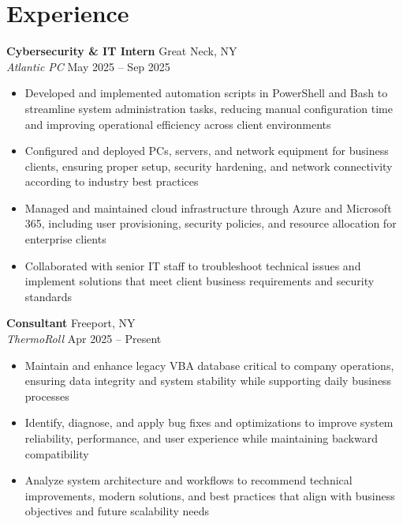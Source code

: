 \documentclass[a4paper,10pt]{article}
\newcommand{\company}[1]{\textit{\small #1}}
\begin{document}
\section*{Experience}
\noindent\textbf{Cybersecurity \& IT Intern} \hfill Great Neck, NY \\
\company{Atlantic PC} \hfill May 2025 -- Sep 2025
\begin{itemize}
\item Developed and implemented automation scripts in PowerShell and Bash to streamline system administration tasks, reducing manual configuration time and improving operational efficiency across client environments
\item Configured and deployed PCs, servers, and network equipment for business clients, ensuring proper setup, security hardening, and network connectivity according to industry best practices
\item Managed and maintained cloud infrastructure through Azure and Microsoft 365, including user provisioning, security policies, and resource allocation for enterprise clients
\item Collaborated with senior IT staff to troubleshoot technical issues and implement solutions that meet client business requirements and security standards
\end{itemize}
\noindent\textbf{Consultant} \hfill Freeport, NY \\
\company{ThermoRoll} \hfill Apr 2025 -- Present
\begin{itemize}
\item Maintain and enhance legacy VBA database critical to company operations, ensuring data integrity and system stability while supporting daily business processes
\item Identify, diagnose, and apply bug fixes and optimizations to improve system reliability, performance, and user experience while maintaining backward compatibility
\item Analyze system architecture and workflows to recommend technical improvements, modern solutions, and best practices that align with business objectives and future scalability needs
\end{itemize}
\vspace{2pt}
\end{document}

